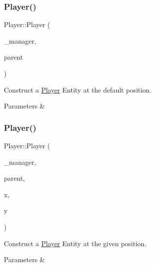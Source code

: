 \subsubsection{\texorpdfstring{Player()}{Player()}\hspace{0.1cm}{\footnotesize\ttfamily [1/3]}}
{\footnotesize\ttfamily Player\+::\+Player (\begin{DoxyParamCaption}\item[{\mbox{\hyperlink{class_game_manager}{Game\+Manager}} $\ast$}]{\+\_\+manager,  }\item[{\mbox{\hyperlink{class_game_entity}{Game\+Entity}} $\ast$}]{parent }\end{DoxyParamCaption})}



Construct a \mbox{\hyperlink{class_player}{Player}} Entity at the default position. 


\begin{DoxyParams}{Parameters}
{\em } & \\
\hline
\end{DoxyParams}
\mbox{\label{class_player_ad4699524916b2621f062c30701eb7a32}} 
\subsubsection{\texorpdfstring{Player()}{Player()}\hspace{0.1cm}{\footnotesize\ttfamily [2/3]}}
{\footnotesize\ttfamily Player\+::\+Player (\begin{DoxyParamCaption}\item[{\mbox{\hyperlink{class_game_manager}{Game\+Manager}} $\ast$}]{\+\_\+manager,  }\item[{\mbox{\hyperlink{class_game_entity}{Game\+Entity}} $\ast$}]{parent,  }\item[{float}]{x,  }\item[{float}]{y }\end{DoxyParamCaption})}



Construct a \mbox{\hyperlink{class_player}{Player}} Entity at the given position. 


\begin{DoxyParams}{Parameters}
{\em } & \\
\hline
\end{DoxyParams}
\mbox{\label{class_player_a3efcb969a2456cf7814fc50be53489a6}} 
